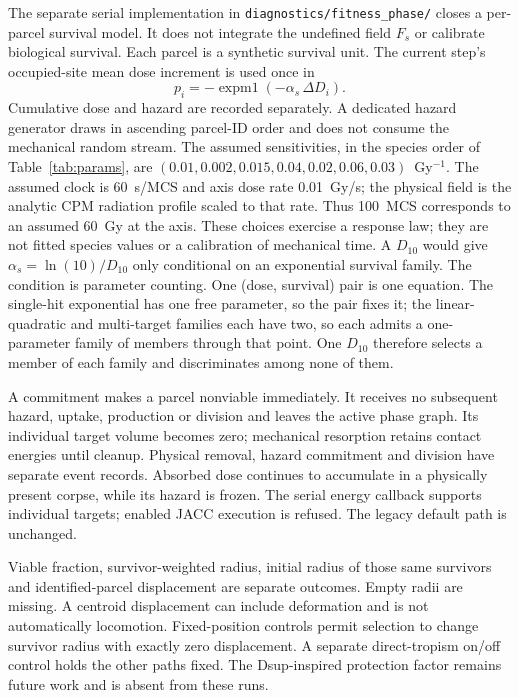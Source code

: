 \documentclass[11pt]{article}
\begin{document}
The separate serial implementation in \texttt{diagnostics/fitness\_phase/} closes a
per-parcel survival model. It does not integrate the undefined field $F_s$ or calibrate
biological survival. Each parcel is a synthetic survival unit. The current step's
occupied-site mean dose increment is used once in
\begin{equation}
 p_i=-\operatorname{expm1}(-\alpha_s\,\Delta D_i).
 \label{eq:survival_hazard}
\end{equation}
Cumulative dose and hazard are recorded separately. A dedicated hazard generator draws
in ascending parcel-ID order and does not consume the mechanical random stream.
The assumed sensitivities, in the species order of Table~\ref{tab:params}, are
$(0.01,0.002,0.015,0.04,0.02,0.06,0.03)$~Gy$^{-1}$.
The assumed clock is 60~s/MCS and axis dose rate 0.01~Gy/s; the physical field is the
analytic CPM radiation profile scaled to that rate. Thus 100~MCS corresponds to an
assumed 60~Gy at the axis. These choices exercise a response law; they are not fitted
species values or a calibration of mechanical time. A $D_{10}$ would give
$\alpha_s=\ln(10)/D_{10}$ only conditional on an exponential survival family. The condition is
parameter counting. One (dose, survival) pair is one equation. The single-hit exponential has one
free parameter, so the pair fixes it; the linear-quadratic and multi-target families each have two,
so each admits a one-parameter family of members through that point. One $D_{10}$ therefore selects
a member of each family and discriminates among none of them.

A commitment makes a parcel nonviable immediately. It receives no subsequent hazard,
uptake, production or division and leaves the active phase graph. Its individual target
volume becomes zero; mechanical resorption retains contact energies until cleanup.
Physical removal, hazard commitment and division have separate event records.
Absorbed dose continues to accumulate in a physically present corpse, while its hazard
is frozen. The serial energy callback supports individual targets; enabled JACC
execution is refused. The legacy default path is unchanged.

Viable fraction, survivor-weighted radius, initial radius of those same survivors and
identified-parcel displacement are separate outcomes. Empty radii are missing. A
centroid displacement can include deformation and is not automatically locomotion.
Fixed-position controls permit selection to change survivor radius with exactly zero
displacement. A separate direct-tropism on/off control holds the other paths fixed.
The Dsup-inspired protection factor remains future work and is absent from these runs.
\end{document}
